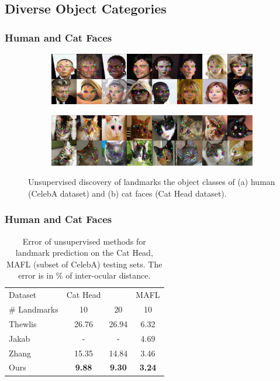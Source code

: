 	\subsection{Diverse Object Categories}
		\begin{frame}
		\frametitle{Human and Cat Faces}
			\begin{figure}[htp]
				\centering
				\begin{subfigure}{1.\textwidth}
				\includegraphics[trim={0cm 0cm 0cm 0cm},clip, width=1.\linewidth]{fig/shape/0celeba}\caption{}
				\end{subfigure}
				\begin{subfigure}{1.\textwidth}
				\includegraphics[trim={0cm 0cm 0cm 0cm},clip, width=1.\linewidth]{fig/shape/0cats}\caption{}
				\end{subfigure}
				\caption{{Unsupervised discovery of landmarks the object classes of (a) human (CelebA dataset) and (b) cat faces (Cat Head dataset).}}
				\label{fig:kp_faces}
			\end{figure}
		\end{frame}

		\begin{frame}[t]
		\frametitle{Human and Cat Faces}
			\begin{table}[t]
					\caption{Error of unsupervised methods for landmark prediction on the Cat Head, MAFL (subset of CelebA) testing sets. The error is in \% of inter-ocular distance.}
					\label{tab:faces}
					\centering
					\begin{tabular}{l|ccc}
					\hline
					Dataset & Cat Head &  & MAFL \\
					  \# Landmarks &10 & 20  & 10  \\
					  \hline
					 Thewlis \cite{thewlis17}
					 & 26.76 & 26.94 & 6.32    \\
					 Jakab \cite{jakab18}
					 & - & - & 4.69  \\
					 Zhang \cite{zhang18}
					 & 15.35 & 14.84 & 3.46  \\
					  Ours & \textbf{9.88}  & \textbf{9.30} & \textbf{3.24}  \\ \hline  %
					\end{tabular}
			\end{table}
		\end{frame}

